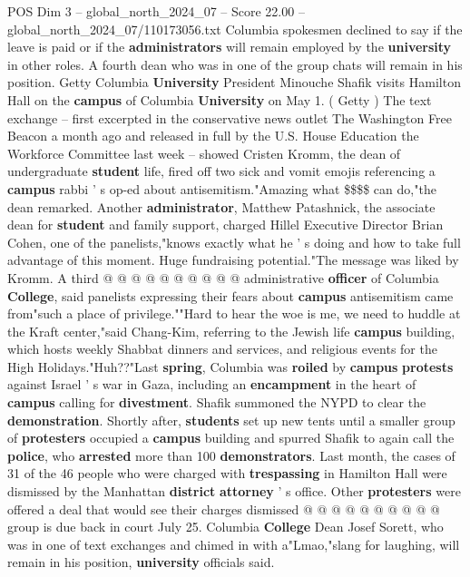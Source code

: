 \begin{textsample}{POS Dim 3 – global\_north\_2024\_07 – Score 22.00 – global\_north\_2024\_07/110173056.txt}  \label{ex:f3_pos_081}
Columbia spokesmen declined to say if the leave is paid or if the \textbf{administrators} will remain employed by the \textbf{university} in other roles.
A fourth dean who was in one of the group chats will remain in his position.
Getty Columbia \textbf{University} President Minouche Shafik visits Hamilton Hall on the \textbf{campus} of Columbia \textbf{University} on May 1. ( Getty ) The text exchange -- first excerpted in the conservative news outlet The Washington Free Beacon a month ago and released in full by the U.S.
House Education the Workforce Committee last week -- showed Cristen Kromm, the dean of undergraduate \textbf{student} life, fired off two sick and vomit emojis referencing a \textbf{campus} rabbi ' s op-ed about antisemitism."Amazing what \$\$\$\$ can do,"the dean remarked.
Another \textbf{administrator}, Matthew Patashnick, the associate dean for \textbf{student} and family support, charged Hillel Executive Director Brian Cohen, one of the panelists,"knows exactly what he ' s doing and how to take full advantage of this moment.
Huge fundraising potential."The message was liked by Kromm.
A third @ @ @ @ @ @ @ @ @ @ administrative \textbf{officer} of Columbia \textbf{College}, said panelists expressing their fears about \textbf{campus} antisemitism came from"such a place of privilege.""Hard to hear the woe is me, we need to huddle at the Kraft center,"said Chang-Kim, referring to the Jewish life \textbf{campus} building, which hosts weekly Shabbat dinners and services, and religious events for the High Holidays."Huh??"Last \textbf{spring}, Columbia was \textbf{roiled} by \textbf{campus} \textbf{protests} against Israel ' s war in Gaza, including an \textbf{encampment} in the heart of \textbf{campus} calling for \textbf{divestment}.
Shafik summoned the NYPD to clear the \textbf{demonstration}.
Shortly after, \textbf{students} set up new tents until a smaller group of \textbf{protesters} occupied a \textbf{campus} building and spurred Shafik to again call the \textbf{police}, who \textbf{arrested} more than 100 \textbf{demonstrators}.
Last month, the cases of 31 of the 46 people who were charged with \textbf{trespassing} in Hamilton Hall were dismissed by the Manhattan \textbf{district} \textbf{attorney} ' s office.
Other \textbf{protesters} were offered a deal that would see their charges dismissed @ @ @ @ @ @ @ @ @ @ group is due back in court July 25.
Columbia \textbf{College} Dean Josef Sorett, who was in one of text exchanges and chimed in with a"Lmao,"slang for laughing, will remain in his position, \textbf{university} officials said.

\end{textsample}
